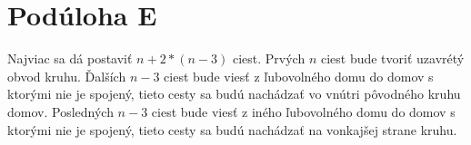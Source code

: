 \documentclass{article}
\begin{document}
\section{Podúloha E}

Najviac sa dá postaviť \(n + 2 * (n - 3)\) ciest. Prvých \(n\) ciest bude tvoriť uzavrétý obvod kruhu. Ďalších \(n - 3\) ciest bude viesť z ľubovolného domu do domov s ktorými nie je spojený, tieto cesty sa budú nachádzať vo vnútri pôvodného kruhu domov. Posledných \(n - 3\) ciest bude viesť z iného ľubovolného domu do domov s ktorými nie je spojený, tieto cesty sa budú nachádzať na vonkajšej strane kruhu.
\end{document}

